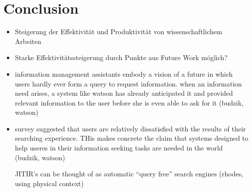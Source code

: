 \section{Conclusion}
 \begin{itemize}
 		\item Steigerung der Effektivität und Produktivität von wissenschaftlichem Arbeiten
 		\item Starke Effektivitätssteigerung durch Punkte aus Future Work möglich?
 		\item information management assistants embody a vision of a future in which users hardly ever form a query to request information. when an information need arises, a system like watson has already anticipated it and provided relevant information to the user before she is even able to ask for it (budzik, watson)
 		\item survey suggested that users are relatively dissatisfied with the results of their searching experience. THis makes concrete the claim that systems designed to help useres in their information seeking tasks are needed in the world (budzik, watson)

 		JITIR's can be thought of as automatic ``query free'' search engines (rhodes, using physical context)
 	\end{itemize}